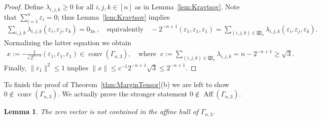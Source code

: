 \documentclass[10pt,a4paper]{article}
\newtheorem{lem}[thm]{Lemma}\crefname{lem}{Lemma}{Lemmas}
\numberwithin{equation}{section}
\DeclareMathOperator{\aff}{Aff}
\DeclareMathOperator{\conv}{conv}
\newcommand{\eps}{\varepsilon}
\newcommand{\norm}[1]{\lVert#1\rVert}
\begin{document}
\begin{proof}
Define $\lambda_{i,j,k} \geq 0$ for all $i,j,k \in [n]$ as in Lemma~\ref{lem:Kravtsov}. Note that $\sum_{i = 1}^n \eps_i = 0$; thus Lemma~\ref{lem:Kravtsov} implies
	\begin{align*}
	\sum_{i,j,k} \lambda_{i,j,k} (\eps_i,\eps_j,\eps_k) = 0_{3n} \, , \quad \text{equivalently} \quad
	-2^{-n+1}(\eps_1,\eps_1,\eps_1) = \sum_{(i,j,k) \in \mathfrak{W}_n} \lambda_{i,j,k}(\eps_i,\eps_j,\eps_k).
	\end{align*}
Normalizing the latter equation we obtain
	\begin{align*}
	x:= -\frac{1}{c \, 2^{n-1}} (\eps_1,\eps_1,\eps_1) \in \conv(\Gamma_{n,3}), \quad \text{where }\;
	c := \sum_{(i,j,k)\in \mathfrak{W}_n} \lambda_{i,j,k} = n-2^{-n+1} \geq \sqrt{3}.
	\end{align*}
Finally, $\norm{\eps_1}^2 \leq 1$ implies $\norm{x} \leq c^{-1} 2^{-n+1} \sqrt{3} \leq 2^{-n+1}$.
\end{proof}

To finish the proof of Theorem~\ref{thm:MarginTensor}(b) we are left to show $0 \notin \conv(\Gamma_{n,3})$. We actually prove the stronger statement $0 \notin \aff(\Gamma_{n,3})$.

\begin{lem}\label{lem:affineHullKravtsov}
The zero vector is not contained  in the affine hull of $\Gamma_{n,3}$.
\end{lem}
\end{document}
